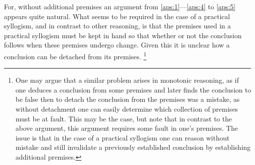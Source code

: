 \documentclass[10pt]{article}
\begin{document}
For, without additional premises an argument from \ref{aps:1}---\ref{aps:4} to \ref{aps:5} appears quite natural.
What seems to be required in the case of a practical syllogism, and in contrast to other reasoning, is that the premises used in a practical syllogism must be kept in hand so that whether or not the conclusion follows when these premises undergo change.
Given this it is unclear how a conclusion can be detached from its premises.\nolinebreak
\footnote{One may argue that a similar problem arises in monotonic reasoning, as if one deduces a conclusion from some premises and later finds the conclusion to be false then to detach the conclusion from the premises was a mistake, as without detachment one can easily determine which collection of premises must be at fault.
  This may be the case, but note that in contrast to the above argument, this argument requires some fault in one's premises.
  The issue is that in the case of a practical syllogism one can reason without mistake and still invalidate a previously established conclusion by establishing additional premises.}
\end{document}
